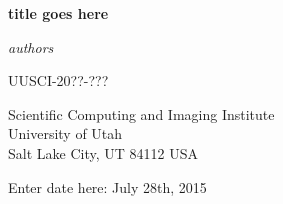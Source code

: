 \documentclass[11pt]{report}
\begin{document}
\begin{centering}
\LARGE\textbf{title goes here }

\vspace{4ex} %

\large\emph{authors}

\vspace{4ex} %

\large\sf UUSCI-20??-???

\end{centering}

\renewcommand{\footnoterule}{\rule{0pt}{0pt}\vspace{0pt}}
%

\vspace{0.1in}

\begin{center}
Scientific Computing and Imaging Institute\\
University of Utah\\
Salt Lake City, UT 84112 USA

\vspace{1ex}

Enter date here: July 28th, 2015
\end{center}


\begin{center}
\vspace{0.125in} 
\end{center}
\end{document}
